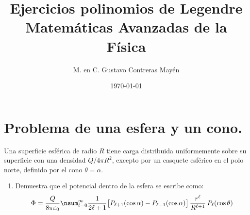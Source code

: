 
\title{Ejercicios polinomios de Legendre \\[0.3em]  \large{Matemáticas Avanzadas de la Física}\vspace{-3ex}}
\author{M. en C. Gustavo Contreras Mayén}
\date{\today}

\vspace{-4cm}
\maketitle
\fontsize{14}{14}\selectfont

\section{Problema de una esfera y un cono.}

Una superficie esférica de radio $R$ tiene carga distribuida uniformemente sobre su superficie con una densidad $Q / 4 \pi R^{2}$, excepto por un casquete esférico en el polo norte, definido por el cono $\theta = \alpha$.

\begin{enumerate}
\item Demuestra que el potencial dentro de la esfera se escribe como:
\begin{align*}
\Phi = \dfrac{Q}{8 \pi \varepsilon_{0}} \nsum_{\ell=0}^{\infty} \dfrac{1}{2 \ell + 1} \big[ P_{\ell+1} (\cos \alpha) - P_{\ell-1} (\cos \alpha) \big] \, \dfrac{r^{\ell}}{R^{\ell+1}} \, P_{\ell} (\cos \theta)
\end{align*}
\end{enumerate}

